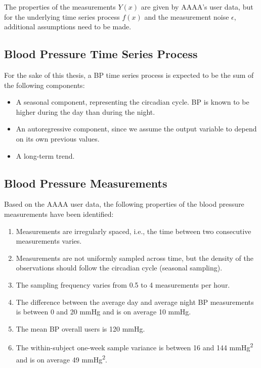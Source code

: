 The properties of the measurements $Y(x)$ are given by AAAA's user data, but for
the underlying time series process $f(x)$ and the measurement noise $\epsilon$,
additional assumptions need to be made.

\subsection{Blood Pressure Time Series Process}\label{subsec:blood-pressure-time-series-process}

For the sake of this thesis, a BP time series process is expected to be the sum of
the following components:

\begin{itemize}
    \item A seasonal component, representing the circadian cycle. BP is known to
    be higher during the day than during the night.
    \item An autoregressive component, since we assume the output variable to
    depend on its own previous values.
    \item A long-term trend.
\end{itemize}

\subsection{Blood Pressure Measurements}\label{subsec:blood-pressure-measurements}

Based on the AAAA user data, the following properties of the blood pressure
measurements have been identified:

\begin{enumerate}
    \item Measurements are irregularly spaced, i.e., the time between two
    consecutive measurements varies.
    \item Measurements are not uniformly sampled across time, but the density of
    the observations should follow the circadian cycle (seasonal sampling).
    \item The sampling frequency varies from 0.5 to 4 measurements per hour.
    \item The difference between the average day and average night BP measurements
    is between 0 and 20 mmHg and is on average 10 mmHg.
    \item The mean BP overall users is 120 mmHg.
    \item The within-subject one-week sample variance is between 16 and 144
    mmHg\textsuperscript{2} and is on average 49 mmHg\textsuperscript{2}.
\end{enumerate}

